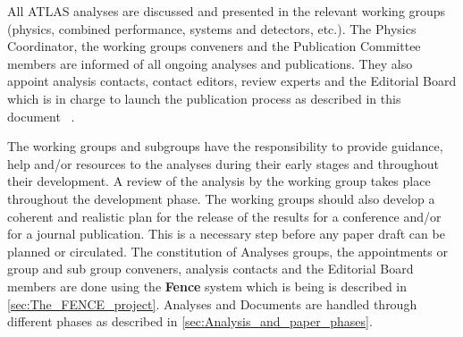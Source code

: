 All ATLAS analyses are discussed and presented in the relevant working groups  (physics, combined performance, systems and detectors, etc.). The Physics Coordinator, the working groups conveners and the Publication Committee members are informed of all ongoing analyses and publications. They also appoint analysis contacts, contact editors, review experts and the Editorial Board which is in charge to launch the publication process as described in this  document~\cite{Pub-policy} .

The working groups and subgroups have the responsibility to provide guidance, help and/or resources to the analyses during their early stages and throughout their development. A review of the analysis by the working group takes place throughout the development phase. The working groups should also develop a coherent and realistic plan for the release  of the results for a conference and/or for a journal publication. This is a necessary step before any paper draft can be planned or circulated. The constitution of Analyses groups, the appointments or group and sub group conveners, analysis contacts and the Editorial Board members are done using the\textbf{ Fence} system which is being is described in \cref{sec:The_FENCE_project}. Analyses and Documents are handled through different phases as described in \cref{sec:Analysis_and_paper_phases}.

